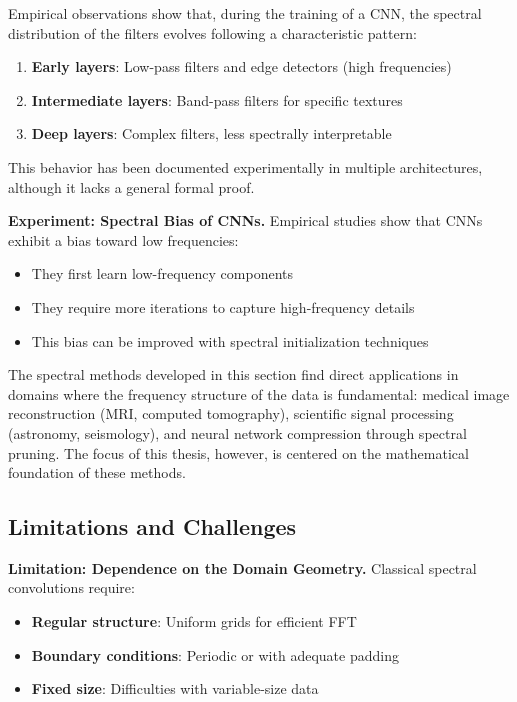 \begin{remark}\label{rem:evolucion_espectral}
Empirical observations show that, during the training of a CNN, the spectral distribution of the filters evolves following a characteristic pattern:
\begin{enumerate}
    \item \textbf{Early layers}: Low-pass filters and edge detectors (high frequencies)
    \item \textbf{Intermediate layers}: Band-pass filters for specific textures
    \item \textbf{Deep layers}: Complex filters, less spectrally interpretable
\end{enumerate}
This behavior has been documented experimentally in multiple architectures, although it lacks a general formal proof.
\end{remark}

\textbf{Experiment: Spectral Bias of CNNs.}\label{exp:sesgo_espectral} Empirical studies show that CNNs exhibit a bias toward low frequencies:
\begin{itemize}
    \item They first learn low-frequency components
    \item They require more iterations to capture high-frequency details
    \item This bias can be improved with spectral initialization techniques
\end{itemize}

The spectral methods developed in this section find direct applications in domains where the frequency structure of the data is fundamental: medical image reconstruction (MRI, computed tomography), scientific signal processing (astronomy, seismology), and neural network compression through spectral pruning. The focus of this thesis, however, is centered on the mathematical foundation of these methods.

\subsection{Limitations and Challenges}\label{subsec:aplicaciones_limitaciones}

\textbf{Limitation: Dependence on the Domain Geometry.}\label{lim:geometria_dominio} Classical spectral convolutions require:
\begin{itemize}
    \item \textbf{Regular structure}: Uniform grids for efficient \gls{FFT}
    \item \textbf{Boundary conditions}: Periodic or with adequate padding
    \item \textbf{Fixed size}: Difficulties with variable-size data
\end{itemize}

